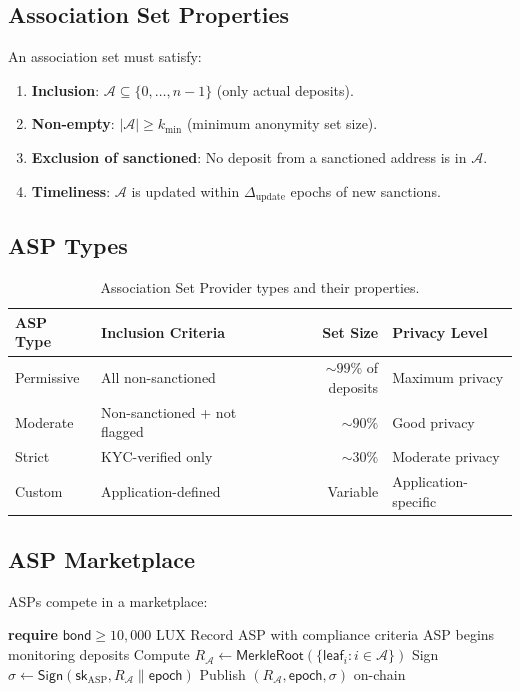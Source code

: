 \documentclass[11pt,a4paper]{article}
\begin{document}
\subsection{Association Set Properties}

An association set must satisfy:
\begin{enumerate}
    \item \textbf{Inclusion}: $\mathcal{A} \subseteq \{0, \ldots, n-1\}$ (only actual deposits).
    \item \textbf{Non-empty}: $|\mathcal{A}| \geq k_{\min}$ (minimum anonymity set size).
    \item \textbf{Exclusion of sanctioned}: No deposit from a sanctioned address is in $\mathcal{A}$.
    \item \textbf{Timeliness}: $\mathcal{A}$ is updated within $\Delta_{\text{update}}$ epochs of new sanctions.
\end{enumerate}

\subsection{ASP Types}

\begin{table}[H]
\centering
\caption{Association Set Provider types and their properties.}
\label{tab:asps}
\begin{tabular}{p{3cm}p{3cm}rp{3.5cm}}
\toprule
\textbf{ASP Type} & \textbf{Inclusion Criteria} & \textbf{Set Size} & \textbf{Privacy Level} \\
\midrule
Permissive & All non-sanctioned & $\sim 99\%$ of deposits & Maximum privacy \\
Moderate & Non-sanctioned + not flagged & $\sim 90\%$ & Good privacy \\
Strict & KYC-verified only & $\sim 30\%$ & Moderate privacy \\
Custom & Application-defined & Variable & Application-specific \\
\bottomrule
\end{tabular}
\end{table}

\subsection{ASP Marketplace}

ASPs compete in a marketplace:

\begin{algorithm}[H]
\caption{ASP Registration and Set Publication}
\label{alg:asp}
\begin{algorithmic}[1]
    \State \textbf{require} $\mathsf{bond} \geq 10{,}000$ LUX
    \State Record ASP with compliance criteria
    \State ASP begins monitoring deposits
\EndProcedure
{}
    \State Compute $R_{\mathcal{A}} \gets \mathsf{MerkleRoot}(\{\mathsf{leaf}_i : i \in \mathcal{A}\})$
    \State Sign $\sigma \gets \mathsf{Sign}(\mathsf{sk}_{\text{ASP}}, R_{\mathcal{A}} \| \mathsf{epoch})$
    \State Publish $(R_{\mathcal{A}}, \mathsf{epoch}, \sigma)$ on-chain
\EndProcedure
\end{algorithmic}
\end{algorithm}
\end{document}
